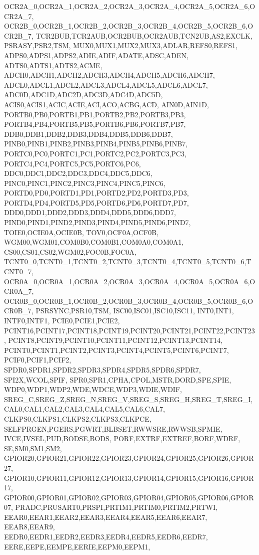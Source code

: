 {{				OCR2A_0,OCR2A_1,OCR2A_2,OCR2A_3,OCR2A_4,OCR2A_5,OCR2A_6,OCR2A_7,
				OCR2B_0,OCR2B_1,OCR2B_2,OCR2B_3,OCR2B_4,OCR2B_5,OCR2B_6,OCR2B_7,
				TCR2BUB,TCR2AUB,OCR2BUB,OCR2AUB,TCN2UB,AS2,EXCLK,
				PSRASY,PSR2,TSM,
				MUX0,MUX1,MUX2,MUX3,ADLAR,REFS0,REFS1,
				ADPS0,ADPS1,ADPS2,ADIE,ADIF,ADATE,ADSC,ADEN,
				ADTS0,ADTS1,ADTS2,ACME,
				ADCH0,ADCH1,ADCH2,ADCH3,ADCH4,ADCH5,ADCH6,ADCH7,
				ADCL0,ADCL1,ADCL2,ADCL3,ADCL4,ADCL5,ADCL6,ADCL7,
				ADC0D,ADC1D,ADC2D,ADC3D,ADC4D,ADC5D,
				ACIS0,ACIS1,ACIC,ACIE,ACI,ACO,ACBG,ACD,
				AIN0D,AIN1D,
				PORTB0,PB0,PORTB1,PB1,PORTB2,PB2,PORTB3,PB3,
				PORTB4,PB4,PORTB5,PB5,PORTB6,PB6,PORTB7,PB7,
				DDB0,DDB1,DDB2,DDB3,DDB4,DDB5,DDB6,DDB7,
				PINB0,PINB1,PINB2,PINB3,PINB4,PINB5,PINB6,PINB7,
				PORTC0,PC0,PORTC1,PC1,PORTC2,PC2,PORTC3,PC3,
				PORTC4,PC4,PORTC5,PC5,PORTC6,PC6,
				DDC0,DDC1,DDC2,DDC3,DDC4,DDC5,DDC6,
				PINC0,PINC1,PINC2,PINC3,PINC4,PINC5,PINC6,
				PORTD0,PD0,PORTD1,PD1,PORTD2,PD2,PORTD3,PD3,
				PORTD4,PD4,PORTD5,PD5,PORTD6,PD6,PORTD7,PD7,
				DDD0,DDD1,DDD2,DDD3,DDD4,DDD5,DDD6,DDD7,
				PIND0,PIND1,PIND2,PIND3,PIND4,PIND5,PIND6,PIND7,
				TOIE0,OCIE0A,OCIE0B,
				TOV0,OCF0A,OCF0B,
				WGM00,WGM01,COM0B0,COM0B1,COM0A0,COM0A1,
				CS00,CS01,CS02,WGM02,FOC0B,FOC0A,
				TCNT0_0,TCNT0_1,TCNT0_2,TCNT0_3,TCNT0_4,TCNT0_5,TCNT0_6,TCNT0_7,
				OCR0A_0,OCR0A_1,OCR0A_2,OCR0A_3,OCR0A_4,OCR0A_5,OCR0A_6,OCR0A_7,
				OCR0B_0,OCR0B_1,OCR0B_2,OCR0B_3,OCR0B_4,OCR0B_5,OCR0B_6,OCR0B_7,
				PSRSYNC,PSR10,TSM,
				ISC00,ISC01,ISC10,ISC11,
				INT0,INT1,
				INTF0,INTF1,
				PCIE0,PCIE1,PCIE2,
				PCINT16,PCINT17,PCINT18,PCINT19,PCINT20,PCINT21,PCINT22,PCINT23,
				PCINT8,PCINT9,PCINT10,PCINT11,PCINT12,PCINT13,PCINT14,
				PCINT0,PCINT1,PCINT2,PCINT3,PCINT4,PCINT5,PCINT6,PCINT7,
				PCIF0,PCIF1,PCIF2,
				SPDR0,SPDR1,SPDR2,SPDR3,SPDR4,SPDR5,SPDR6,SPDR7,
				SPI2X,WCOL,SPIF,
				SPR0,SPR1,CPHA,CPOL,MSTR,DORD,SPE,SPIE,
				WDP0,WDP1,WDP2,WDE,WDCE,WDP3,WDIE,WDIF,
				SREG_C,SREG_Z,SREG_N,SREG_V,SREG_S,SREG_H,SREG_T,SREG_I,
				CAL0,CAL1,CAL2,CAL3,CAL4,CAL5,CAL6,CAL7,
				CLKPS0,CLKPS1,CLKPS2,CLKPS3,CLKPCE,
				SELFPRGEN,PGERS,PGWRT,BLBSET,RWWSRE,RWWSB,SPMIE,
				IVCE,IVSEL,PUD,BODSE,BODS,
				PORF,EXTRF,EXTREF,BORF,WDRF,
				SE,SM0,SM1,SM2,
				GPIOR20,GPIOR21,GPIOR22,GPIOR23,GPIOR24,GPIOR25,GPIOR26,GPIOR27,
				GPIOR10,GPIOR11,GPIOR12,GPIOR13,GPIOR14,GPIOR15,GPIOR16,GPIOR17,
				GPIOR00,GPIOR01,GPIOR02,GPIOR03,GPIOR04,GPIOR05,GPIOR06,GPIOR07,
				PRADC,PRUSART0,PRSPI,PRTIM1,PRTIM0,PRTIM2,PRTWI,
				EEAR0,EEAR1,EEAR2,EEAR3,EEAR4,EEAR5,EEAR6,EEAR7,
				EEAR8,EEAR9,
				EEDR0,EEDR1,EEDR2,EEDR3,EEDR4,EEDR5,EEDR6,EEDR7,
				EERE,EEPE,EEMPE,EERIE,EEPM0,EEPM1,
}}
